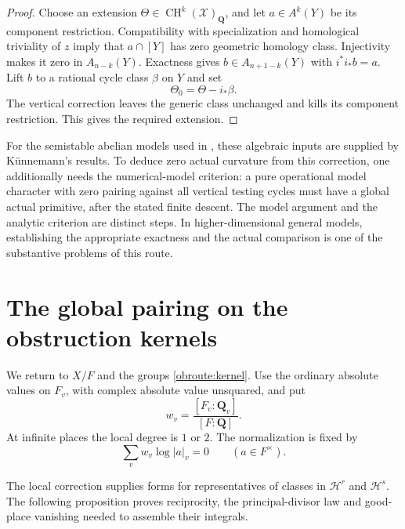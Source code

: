 \documentclass[11pt,a4paper]{article}
\theoremstyle{definition}
\numberwithin{equation}{section}
\newcommand{\CH}{\operatorname{CH}}
\newcommand{\Q}{\mathbf Q}
\begin{document}
\begin{proof}
Choose an extension $\Theta\in\CH^k(\mathcal X)_\Q$, and let $a\in A^k(Y)$ be its component restriction. Compatibility with specialization and homological triviality of $z$ imply that $a\cap[Y]$ has zero geometric homology class. Injectivity makes it zero in $A_{n-k}(Y)$. Exactness gives $b\in A_{n+1-k}(Y)$ with $i^*i_*b=a$. Lift $b$ to a rational cycle class $\beta$ on $Y$ and set
\[
 \Theta_0=\Theta-i_*\beta.
\]
The vertical correction leaves the generic class unchanged and kills its component restriction. This gives the required extension.
\end{proof}

For the semistable abelian models used in \cite[Section 3.1]{Domains}, these algebraic inputs are supplied by K\"unnemann's results. To deduce zero actual curvature from this correction, one additionally needs the numerical-model criterion: a pure operational model character with zero pairing against all vertical testing cycles must have a global actual primitive, after the stated finite descent. The model argument and the analytic criterion are distinct steps. In higher-dimensional general models, establishing the appropriate exactness and the actual comparison is one of the substantive problems of this route.

\section{The global pairing on the obstruction kernels}\label{obroute:global}

We return to $X/F$ and the groups \eqref{obroute:kernel}. Use the ordinary absolute values on $F_v$, with complex absolute value unsquared, and put
\[
 w_v=\frac{[F_v:\Q_v]}{[F:\Q]}.
\]
At infinite places the local degree is $1$ or $2$. The normalization is fixed by
\begin{equation}\label{obroute:product-formula}
 \sum_v w_v\log|a|_v=0\qquad(a\in F^\times).
\end{equation}

The local correction supplies forms for representatives of classes in $\mathcal H^r$ and $\mathcal H^s$. The following proposition proves reciprocity, the principal-divisor law and good-place vanishing needed to assemble their integrals.
\end{document}
